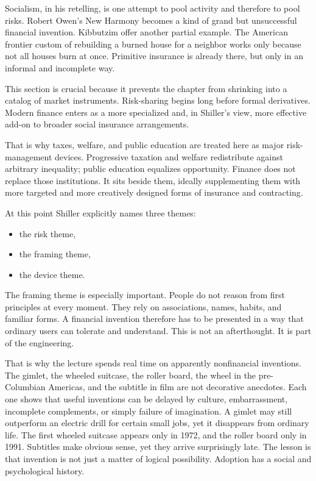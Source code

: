 Socialism, in his retelling, is one attempt to pool activity and therefore to pool risks. Robert Owen's New Harmony becomes a kind of grand but unsuccessful financial invention. Kibbutzim offer another partial example. The American frontier custom of rebuilding a burned house for a neighbor works only because not all houses burn at once. Primitive insurance is already there, but only in an informal and incomplete way.

This section is crucial because it prevents the chapter from shrinking into a catalog of market instruments. Risk-sharing begins long before formal derivatives. Modern finance enters as a more specialized and, in Shiller's view, more effective add-on to broader social insurance arrangements.

That is why taxes, welfare, and public education are treated here as major risk-management devices. Progressive taxation and welfare redistribute against arbitrary inequality; public education equalizes opportunity. Finance does not replace those institutions. It sits beside them, ideally supplementing them with more targeted and more creatively designed forms of insurance and contracting.

At this point Shiller explicitly names three themes:
\begin{itemize}
\item the risk theme,
\item the framing theme,
\item the device theme.
\end{itemize}

The framing theme is especially important. People do not reason from first principles at every moment. They rely on associations, names, habits, and familiar forms. A financial invention therefore has to be presented in a way that ordinary users can tolerate and understand. This is not an afterthought. It is part of the engineering.

That is why the lecture spends real time on apparently nonfinancial inventions. The gimlet, the wheeled suitcase, the roller board, the wheel in the pre-Columbian Americas, and the subtitle in film are not decorative anecdotes. Each one shows that useful inventions can be delayed by culture, embarrassment, incomplete complements, or simply failure of imagination. A gimlet may still outperform an electric drill for certain small jobs, yet it disappears from ordinary life. The first wheeled suitcase appears only in 1972, and the roller board only in 1991. Subtitles make obvious sense, yet they arrive surprisingly late. The lesson is that invention is not just a matter of logical possibility. Adoption has a social and psychological history.

